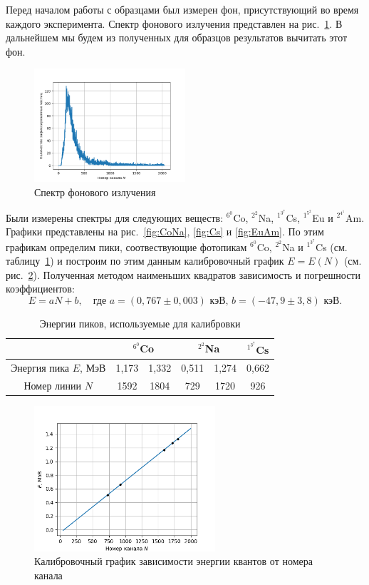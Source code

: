 \documentclass[a4paper,12pt]{article} %
\begin{document}
Перед началом работы с образцами был измерен фон, присутствующий во время каждого эксперимента. Спектр фонового излучения представлен на рис.~\ref{fig:background}. В дальнейшем мы будем из полученных для образцов результатов вычитать этот фон.
\begin{figure}[h]
    \centering
    \includegraphics[width=0.50\textwidth]{background.png}
    \caption{Спектр фонового излучения}
    \label{fig:background}
\end{figure}


Были измерены спектры для следующих веществ: $^6^0$Co, $^2^2$Na, $^1^3^7$Cs, $^1^5^2$Eu и $^2^4^1$Am. Графики представлены на рис.~\ref{fig:CoNa}, \ref{fig:Cs} и \ref{fig:EuAm}. По этим графикам определим пики, соотвествующие фотопикам $^6^0$Co, $^2^2$Na и $^1^3^7$Cs (см. таблицу~\ref{tab:peaks}) и построим по этим данным калибровочный график $E = E(N)$ (см. рис.~\ref{fig:calibr}). Полученная методом наименьших квадратов зависимость и погрешности коэффициентов:
\begin{equation}\label{NtoE}
    E = aN + b,\quad\text{где }a = (0,767\pm0,003)\text{ кэВ, }b = (-47,9\pm3,8)\text{ кэВ.}
\end{equation}
\begin{table}[h]
    \centering
    \begin{tabular}{|c|c|c|c|c|c|} \hline
         & \multicolumn{2}{|c|}{$^6^0$Co} & \multicolumn{2}{|c|}{$^2^2$Na} & $^1^3^7$Cs \\ \hline
        Энергия пика $E$, МэВ & 1,173 & 1,332 & 0,511 & 1,274 & 0,662 \\ \hline
        Номер линии $N$  & 1592 & 1804 & 729 & 1720 & 926 \\ \hline
    \end{tabular}
    \caption{Энергии пиков, используемые для калибровки}
    \label{tab:peaks}
\end{table}
\begin{figure}[h]
    \centering
    \includegraphics[width=0.6\textwidth]{calibr.png}
    \caption{Калибровочный график зависимости энергии квантов от номера канала}
    \label{fig:calibr}
\end{figure}
\end{document}

